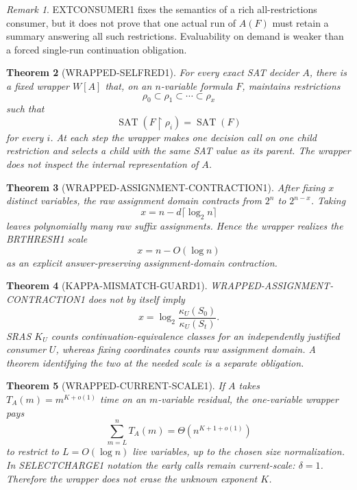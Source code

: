 \documentclass[11pt]{article}
\theoremstyle{plain}
\newtheorem{theorem}{Theorem}[section]
\theoremstyle{definition}
\theoremstyle{remark}
\newtheorem{remark}[theorem]{Remark}
\begin{document}
\begin{remark}
EXTCONSUMER1 fixes the semantics of a rich all-restrictions consumer, but it
does not prove that one actual run of \(A(F)\) must retain a summary answering
all such restrictions.  Evaluability on demand is weaker than a forced
single-run continuation obligation.
\end{remark}

\begin{theorem}[WRAPPED-SELFRED1]
For every exact SAT decider \(A\), there is a fixed wrapper \(W[A]\) that,
on an \(n\)-variable formula \(F\), maintains restrictions
\[
\rho_0\subset\rho_1\subset\cdots\subset\rho_x
\]
such that
\[
\operatorname{SAT}(F\upharpoonright\rho_i)
=
\operatorname{SAT}(F)
\]
for every \(i\).  At each step the wrapper makes one decision call on one
child restriction and selects a child with the same SAT value as its parent.
The wrapper does not inspect the internal representation of \(A\).
\end{theorem}

\begin{theorem}[WRAPPED-ASSIGNMENT-CONTRACTION1]
After fixing \(x\) distinct variables, the raw assignment domain contracts
from \(2^n\) to \(2^{n-x}\).  Taking
\[
x=n-d\lceil\log_2 n\rceil
\]
leaves polynomially many raw suffix assignments.  Hence the wrapper realizes
the BRTHRESH1 scale
\[
x=n-O(\log n)
\]
as an explicit answer-preserving \emph{assignment-domain} contraction.
\end{theorem}

\begin{theorem}[KAPPA-MISMATCH-GUARD1]
WRAPPED-ASSIGNMENT-CONTRACTION1 does not by itself imply
\[
x=
\log_2
\frac{\kappa_U(S_0)}{\kappa_U(S_t)}.
\]
SRAS \(K_U\) counts continuation-equivalence classes for an independently
justified consumer \(U\), whereas fixing coordinates counts raw assignment
domain.  A theorem identifying the two at the needed scale is a separate
obligation.
\end{theorem}

\begin{theorem}[WRAPPED-CURRENT-SCALE1]
If \(A\) takes \(T_A(m)=m^{K+o(1)}\) time on an \(m\)-variable residual, the
one-variable wrapper pays
\[
\sum_{m=L}^{n}T_A(m)
=
\Theta(n^{K+1+o(1)})
\]
to restrict to \(L=O(\log n)\) live variables, up to the chosen size
normalization.  In SELECTCHARGE1 notation the early calls remain
current-scale: \(\delta=1\).  Therefore the wrapper does not erase the unknown
exponent \(K\).
\end{theorem}
\end{document}
